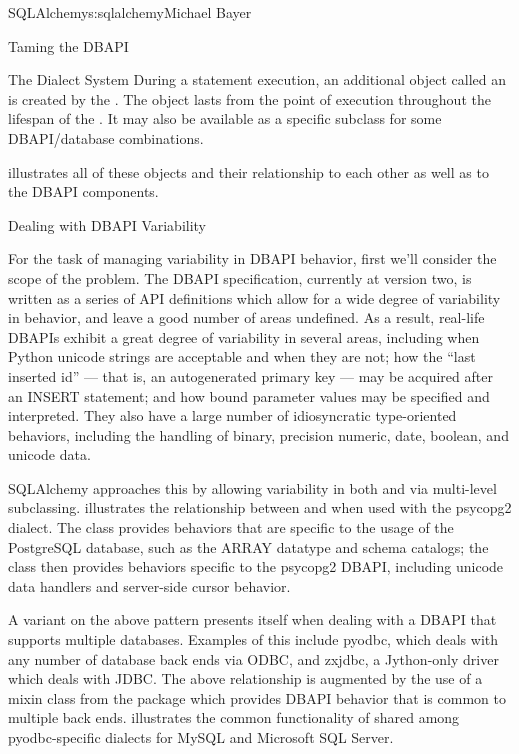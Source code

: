 \begin{aosachapter}{SQLAlchemy}{s:sqlalchemy}{Michael Bayer}
\begin{aosasect1}{Taming the DBAPI}
\begin{aosasect2}{The Dialect System}
During a statement execution, an additional object called an
 is created by the . The object lasts from the
point of execution throughout the lifespan of the . It
may also be available as a specific subclass for some DBAPI/database
combinations.

 illustrates all of these objects and their relationship to each
other as well as to the DBAPI components.


\end{aosasect2}

\begin{aosasect2}{Dealing with DBAPI Variability}

For the task of managing variability in DBAPI behavior,
first we'll consider the scope of the problem. The DBAPI
specification, currently at version two, is written as a series of
API definitions which allow for a wide degree of variability in
behavior, and leave a good number of areas undefined.  As a result, real-life
DBAPIs exhibit a great degree of variability
in several areas, including when Python
unicode strings are acceptable and when they are not; how the
``last inserted id'' --- that is, an autogenerated primary key --- may be
acquired after an INSERT statement; and how bound parameter values
may be specified and interpreted. They also have a large number of idiosyncratic type-oriented
behaviors, including the handling of binary, precision numeric, date,
boolean, and unicode data.

SQLAlchemy approaches this by allowing variability in both  and
 via multi-level subclassing.    illustrates
the relationship between  and  when
used with the psycopg2 dialect.  The  class provides behaviors that
are specific to the usage of the PostgreSQL database, such as the ARRAY datatype
and schema catalogs; the 
class then provides behaviors specific to the psycopg2 DBAPI, including
unicode data handlers and server-side cursor behavior.


A variant on the above pattern presents itself when dealing with a DBAPI
that supports multiple databases.   Examples of this include
pyodbc, which deals with any number of database back ends via ODBC,
and zxjdbc, a Jython-only driver which deals with JDBC.   The above
relationship is augmented by the use of a mixin class from the
 package which provides DBAPI behavior that
is common to multiple back ends.   illustrates the common
functionality of  shared among
pyodbc-specific dialects for MySQL and Microsoft SQL Server.


\end{aosasect2}
\end{aosasect1}
\end{aosachapter}
